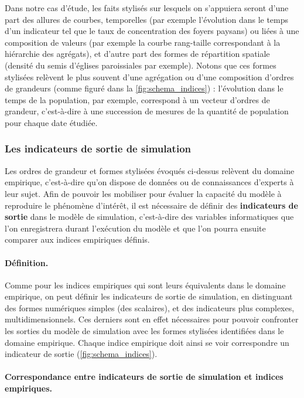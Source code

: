 Dans notre cas d'étude, les faits stylisés sur lesquels on s'appuiera seront d'une part des \og allures\fg{} de courbes, temporelles (par exemple l'évolution dans le temps d'un indicateur tel que le taux de concentration des foyers paysans) ou liées à une composition de valeurs (par exemple la courbe rang-taille correspondant à la hiérarchie des agrégats), et d'autre part des formes de répartition spatiale (densité du semis d'églises paroissiales par exemple).
Notons que ces formes stylisées relèvent le plus souvent d'une agrégation ou d'une composition d'ordres de grandeurs (comme figuré dans la \cref{fig:schema_indices}) :
l'évolution dans le temps de la population, par exemple, correspond à un vecteur d'ordres de grandeur, c'est-à-dire à une succession de mesures de la quantité de population pour chaque date étudiée.

\subsubsection{Les indicateurs de sortie de simulation \label{subsubsec:indicateurs-sortie}}

Les ordres de grandeur et formes stylisées évoqués  ci-dessus relèvent du domaine empirique, c'est-à-dire qu'on dispose de données ou de connaissances d'experts à leur sujet.
Afin de pouvoir les mobiliser pour évaluer la capacité du modèle à reproduire le phénomène d'intérêt, il est nécessaire de définir des \textbf{indicateurs de sortie} dans le modèle de simulation, c'est-à-dire des variables informatiques que l'on enregistrera durant l'exécution du modèle et que l'on pourra ensuite comparer aux indices empiriques définis.

\paragraph{Définition.}
Comme pour les indices empiriques qui sont leurs équivalents dans le domaine empirique, on peut définir les indicateurs de sortie de simulation, en distinguant des formes numériques simples (des scalaires), et des indicateurs plus complexes, multidimensionnels.
Ces derniers sont en effet nécessaires pour pouvoir confronter les sorties du modèle de simulation avec les formes stylisées identifiées dans le domaine empirique.
Chaque indice empirique doit ainsi se voir correspondre un indicateur de sortie (\cref{fig:schema_indices}).

\paragraph{Correspondance entre indicateurs de sortie de simulation et indices empiriques.}\label{par:correspondance}

